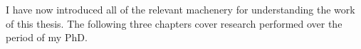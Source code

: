 
I have now introduced all of the relevant machenery for understanding the work of this thesis. The following three chapters cover research performed over the period of my PhD.
